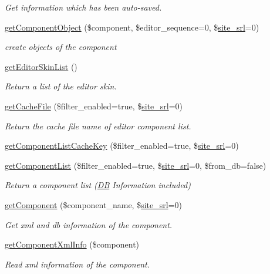 \begin{DoxyCompactItemize}
\begin{DoxyCompactList}\small\item\em Get information which has been auto-\/saved. \end{DoxyCompactList}\item 
\hyperlink{classeditorModel_aef219fecfb7dcd9343cc9028930eaccd}{get\-Component\-Object} (\$component, \$editor\-\_\-sequence=0, \$\hyperlink{ko_8install_8php_a8b1406b4ad1048041558dce6bfe89004}{site\-\_\-srl}=0)
\begin{DoxyCompactList}\small\item\em create objects of the component \end{DoxyCompactList}\item 
\hyperlink{classeditorModel_ae67ee69d58776938a04d14d0df5284ff}{get\-Editor\-Skin\-List} ()
\begin{DoxyCompactList}\small\item\em Return a list of the editor skin. \end{DoxyCompactList}\item 
\hyperlink{classeditorModel_ab125348dd5be10fdafe6e38922254d5e}{get\-Cache\-File} (\$filter\-\_\-enabled=true, \$\hyperlink{ko_8install_8php_a8b1406b4ad1048041558dce6bfe89004}{site\-\_\-srl}=0)
\begin{DoxyCompactList}\small\item\em Return the cache file name of editor component list. \end{DoxyCompactList}\item 
\hyperlink{classeditorModel_a482e455526707ee16d4bd97786c72a2f}{get\-Component\-List\-Cache\-Key} (\$filter\-\_\-enabled=true, \$\hyperlink{ko_8install_8php_a8b1406b4ad1048041558dce6bfe89004}{site\-\_\-srl}=0)
\item 
\hyperlink{classeditorModel_a24cf5d2f9bc9783dd2efd85fb0f89408}{get\-Component\-List} (\$filter\-\_\-enabled=true, \$\hyperlink{ko_8install_8php_a8b1406b4ad1048041558dce6bfe89004}{site\-\_\-srl}=0, \$from\-\_\-db=false)
\begin{DoxyCompactList}\small\item\em Return a component list (\hyperlink{classDB}{D\-B} Information included) \end{DoxyCompactList}\item 
\hyperlink{classeditorModel_a6330fcddc7363899989bfe4128010236}{get\-Component} (\$component\-\_\-name, \$\hyperlink{ko_8install_8php_a8b1406b4ad1048041558dce6bfe89004}{site\-\_\-srl}=0)
\begin{DoxyCompactList}\small\item\em Get xml and db information of the component. \end{DoxyCompactList}\item 
\hyperlink{classeditorModel_ade91abf13956321e293195f2f14b4e2b}{get\-Component\-Xml\-Info} (\$component)
\begin{DoxyCompactList}\small\item\em Read xml information of the component. \end{DoxyCompactList}\end{DoxyCompactItemize}
